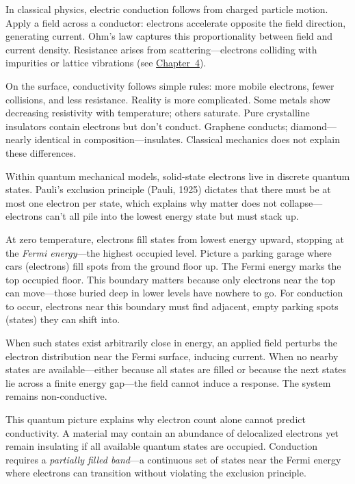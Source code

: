 In classical physics, electric conduction follows from charged particle motion. Apply a field across a conductor: electrons accelerate opposite the field direction, generating current. Ohm's law captures this proportionality between field and current density. Resistance arises from scattering—electrons colliding with impurities or lattice vibrations (see \hyperref[ch:energytransmission]{Chapter~4}).

On the surface, conductivity follows simple rules: more mobile electrons, fewer collisions, and less resistance. Reality is more complicated. Some metals show decreasing resistivity with temperature; others saturate. Pure crystalline insulators contain electrons but don't conduct. Graphene conducts; diamond—nearly identical in composition—insulates. Classical mechanics does not explain these differences.

Within quantum mechanical models, solid-state electrons live in discrete quantum states. Pauli's exclusion principle (Pauli, 1925) dictates that there must be at most one electron per state, which explains why matter does not collapse—electrons can't all pile into the lowest energy state but must stack up.

At zero temperature, electrons fill states from lowest energy upward, stopping at the \emph{Fermi energy}—the highest occupied level. Picture a parking garage where cars (electrons) fill spots from the ground floor up. The Fermi energy marks the top occupied floor. This boundary matters because only electrons near the top can move—those buried deep in lower levels have nowhere to go. For conduction to occur, electrons near this boundary must find adjacent, empty parking spots (states) they can shift into.

When such states exist arbitrarily close in energy, an applied field perturbs the electron distribution near the Fermi surface, inducing current. When no nearby states are available—either because all states are filled or because the next states lie across a finite energy gap—the field cannot induce a response. The system remains non-conductive.

This quantum picture explains why electron count alone cannot predict conductivity. A material may contain an abundance of delocalized electrons yet remain insulating if all available quantum states are occupied. Conduction requires a \emph{partially filled band}—a continuous set of states near the Fermi energy where electrons can transition without violating the exclusion principle.

